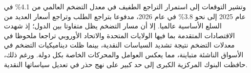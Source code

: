 وتشير التوقعات إلى استمرار التراجع الطفيف في معدل التضخم العالمي من 4.1\% في عام 2025 إلى نحو 3.8\% في عام 2026، مدفوعا بتراجع الطلب وتراجع أسعار العديد من السلع الأساسية عالميا. إلا أن مسار التضخم يظل متفاوتا بين الدول؛ إذ شهدت الاقتصادات المتقدمة بما فيها الولايات المتحدة والاتحاد الأوروبي تراجعا ملحوظا في معدلات التضخم نتيجة تشديد السياسات النقدية، بينما ظلت ديناميكيات التضخم في الأسواق الناشئة متباينة، مما يعكس العوامل والمحركات الخاصة بكل دولة. ورغم ذلك، حافظت البنوك المركزية الكبرى إلى حد كبير على نهج حذر في تعديل سياساتها النقدية.
